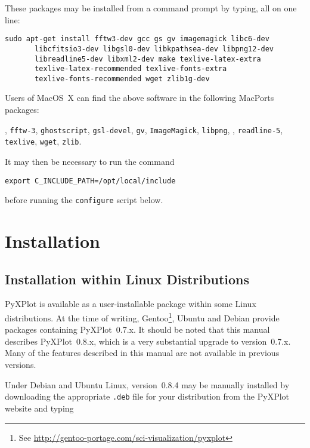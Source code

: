 \noindent These packages may be installed from a command prompt by typing, all on one line:

\begin{verbatim}
sudo apt-get install fftw3-dev gcc gs gv imagemagick libc6-dev
       libcfitsio3-dev libgsl0-dev libkpathsea-dev libpng12-dev
       libreadline5-dev libxml2-dev make texlive-latex-extra
       texlive-latex-recommended texlive-fonts-extra
       texlive-fonts-recommended wget zlib1g-dev
\end{verbatim}

Users of MacOS~X can find the above software in the following MacPorts packages:

\vspace{2mm}
, {\tt fftw-3}, {\tt ghostscript}, {\tt gsl-devel}, {\tt gv}, {\tt ImageMagick}, {\tt libpng},\newline
{}, {\tt readline-5}, {\tt texlive}, {\tt wget}, {\tt zlib}.
\vspace{2mm}

It may then be necessary to run the command
\begin{verbatim}
export C_INCLUDE_PATH=/opt/local/include
\end{verbatim}
before running the {\tt configure} script below.

\section{Installation}

\subsection{Installation within Linux Distributions}

PyXPlot is available as a user-installable package within some Linux
distributions. At the time of writing, Gentoo\footnote{See
\url{http://gentoo-portage.com/sci-visualization/pyxplot}}, Ubuntu and Debian provide packages containing
PyXPlot~0.7.x. It should be noted that this manual describes PyXPlot~0.8.x,
which is a very substantial upgrade to version~0.7.x. Many of the features
described in this manual are not available in previous versions.

Under Debian and Ubuntu Linux, version~0.8.4 may be manually installed by
downloading the appropriate {\tt .deb} file for your distribution from the
PyXPlot website and typing

